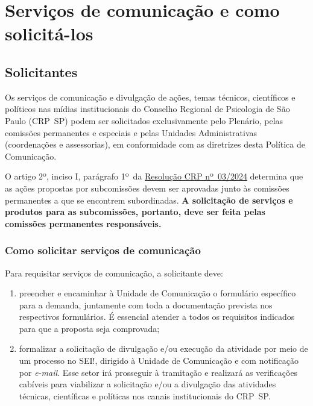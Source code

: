 \chapter{Serviços de comunicação e como
  solicitá-los}

\section{Solicitantes}

Os serviços de comunicação e divulgação de ações, temas técnicos,
científicos e políticos nas mídias institucionais do Conselho Regional
de Psicologia de São Paulo (CRP~SP) podem ser solicitados exclusivamente
pelo Plenário, pelas comissões permanentes e especiais e pelas Unidades
Administrativas (coordenações e assessorias), em conformidade com as
diretrizes desta Política de Comunicação.

O artigo 2º, inciso I, parágrafo 1º~da
\href{https://transparencia.cfp.org.br/wp-content/uploads/sites/29/2024/06/Resolucao-03-2024.pdf}{Resolução
  CRP nº~03/2024} determina que as ações propostas por subcomissões devem
ser aprovadas junto às comissões permanentes a que se encontrem
subordinadas. \textbf{A solicitação de serviços e produtos para as
  subcomissões, portanto, deve ser feita pelas comissões permanentes
  responsáveis.}

\subsection{Como solicitar serviços de
  comunicação}

Para requisitar serviços de comunicação, a solicitante deve:

\begin{enumerate}

  \item
        preencher e encaminhar à Unidade de Comunicação o formulário
        específico para a demanda, juntamente com toda a documentação prevista
        nos respectivos formulários. É essencial atender a todos os requisitos
        indicados para que a proposta seja comprovada;
  \item
        formalizar a solicitação de divulgação e/ou execução da atividade por
        meio de um processo no SEI!, dirigido à Unidade de Comunicação e com
        notificação por \emph{e-mail}. Esse setor irá prosseguir à tramitação
        e realizará as verificações cabíveis para viabilizar a solicitação
        e/ou a divulgação das atividades técnicas, científicas e políticas nos
        canais institucionais do CRP~SP.
\end{enumerate}

